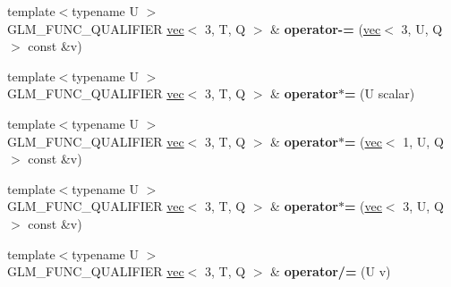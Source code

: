 \begin{DoxyCompactItemize}
\item 
\mbox{\label{structglm_1_1vec_3_013_00_01T_00_01Q_01_4_a4430e8bea2a290bbcd6507102d37914d}} 
{\footnotesize template$<$typename U $>$ }\\G\+L\+M\+\_\+\+F\+U\+N\+C\+\_\+\+Q\+U\+A\+L\+I\+F\+I\+ER \hyperlink{structglm_1_1vec}{vec}$<$ 3, T, Q $>$ \& {\bfseries operator-\/=} (\hyperlink{structglm_1_1vec}{vec}$<$ 3, U, Q $>$ const \&v)
\item 
\mbox{\label{structglm_1_1vec_3_013_00_01T_00_01Q_01_4_ac8d11ce47b7e6cf747d9e9710c422fb3}} 
{\footnotesize template$<$typename U $>$ }\\G\+L\+M\+\_\+\+F\+U\+N\+C\+\_\+\+Q\+U\+A\+L\+I\+F\+I\+ER \hyperlink{structglm_1_1vec}{vec}$<$ 3, T, Q $>$ \& {\bfseries operator$\ast$=} (U scalar)
\item 
\mbox{\label{structglm_1_1vec_3_013_00_01T_00_01Q_01_4_abf00e0a1c52a2ea28c89b50edec4b722}} 
{\footnotesize template$<$typename U $>$ }\\G\+L\+M\+\_\+\+F\+U\+N\+C\+\_\+\+Q\+U\+A\+L\+I\+F\+I\+ER \hyperlink{structglm_1_1vec}{vec}$<$ 3, T, Q $>$ \& {\bfseries operator$\ast$=} (\hyperlink{structglm_1_1vec}{vec}$<$ 1, U, Q $>$ const \&v)
\item 
\mbox{\label{structglm_1_1vec_3_013_00_01T_00_01Q_01_4_a20170b8b71ce0a479ea43b5d4690a1a5}} 
{\footnotesize template$<$typename U $>$ }\\G\+L\+M\+\_\+\+F\+U\+N\+C\+\_\+\+Q\+U\+A\+L\+I\+F\+I\+ER \hyperlink{structglm_1_1vec}{vec}$<$ 3, T, Q $>$ \& {\bfseries operator$\ast$=} (\hyperlink{structglm_1_1vec}{vec}$<$ 3, U, Q $>$ const \&v)
\item 
\mbox{\label{structglm_1_1vec_3_013_00_01T_00_01Q_01_4_a04e2525807011b5085f89df8dd94ff3d}} 
{\footnotesize template$<$typename U $>$ }\\G\+L\+M\+\_\+\+F\+U\+N\+C\+\_\+\+Q\+U\+A\+L\+I\+F\+I\+ER \hyperlink{structglm_1_1vec}{vec}$<$ 3, T, Q $>$ \& {\bfseries operator/=} (U v)
\item 
\mbox{\label{structglm_1_1vec_3_013_00_01T_00_01Q_01_4_a54e324b77b2efc8926c0436608709799}} 

\end{DoxyCompactItemize}
